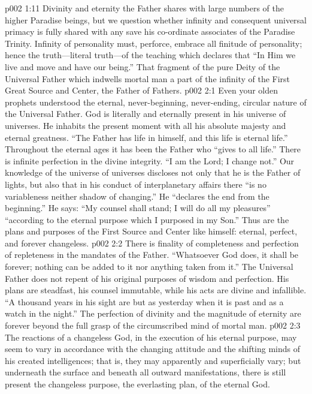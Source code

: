 \vs p002 1:11 Divinity and eternity the Father shares with large numbers of the higher Paradise beings, but we question whether infinity and consequent universal primacy is fully shared with any save his co\hyp{}ordinate associates of the Paradise Trinity. Infinity of personality must, perforce, embrace all finitude of personality; hence the truth---literal truth---of the teaching which declares that “In Him we live and move and have our being.” That fragment of the pure Deity of the Universal Father which indwells mortal man  a part of the infinity of the First Great Source and Center, the Father of Fathers.
\vs p002 2:1 Even your olden prophets understood the eternal, never\hyp{}beginning, never\hyp{}ending, circular nature of the Universal Father. God is literally and eternally present in his universe of universes. He inhabits the present moment with all his absolute majesty and eternal greatness. “The Father has life in himself, and this life is eternal life.” Throughout the eternal ages it has been the Father who “gives to all life.” There is infinite perfection in the divine integrity. “I am the Lord; I change not.” Our knowledge of the universe of universes discloses not only that he is the Father of lights, but also that in his conduct of interplanetary affairs there “is no variableness neither shadow of changing.” He “declares the end from the beginning.” He says: “My counsel shall stand; I will do all my pleasures” “according to the eternal purpose which I purposed in my Son.” Thus are the plans and purposes of the First Source and Center like himself: eternal, perfect, and forever changeless.
\vs p002 2:2 There is finality of completeness and perfection of repleteness in the mandates of the Father. “Whatsoever God does, it shall be forever; nothing can be added to it nor anything taken from it.” The Universal Father does not repent of his original purposes of wisdom and perfection. His plans are steadfast, his counsel immutable, while his acts are divine and infallible. “A thousand years in his sight are but as yesterday when it is past and as a watch in the night.” The perfection of divinity and the magnitude of eternity are forever beyond the full grasp of the circumscribed mind of mortal man.
\pc \vs p002 2:3 The reactions of a changeless God, in the execution of his eternal purpose, may seem to vary in accordance with the changing attitude and the shifting minds of his created intelligences; that is, they may apparently and superficially vary; but underneath the surface and beneath all outward manifestations, there is still present the changeless purpose, the everlasting plan, of the eternal God.
